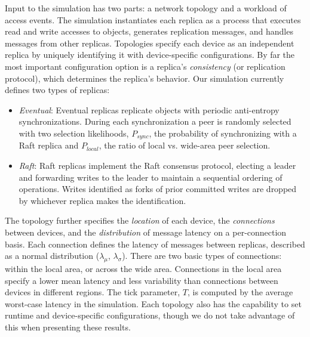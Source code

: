Input to the simulation has two parts: a network topology and a workload of access events.
The simulation instantiates each replica as a process that executes read and write accesses to objects, generates replication messages, and handles messages from other replicas.
Topologies specify each device as an independent replica by uniquely identifying it with device-specific configurations.
By far the most important configuration option is a replica's \textit{consistency} (or replication protocol), which determines the replica's behavior.
Our simulation currently defines two types of replicas:

\begin{itemize}
    \item \emph{Eventual}: Eventual replicas replicate objects with periodic anti-entropy synchronizations. During each synchronization a peer is randomly selected with two selection likelihoods, $P_{sync}$, the probability of synchronizing with a Raft replica and $P_{local}$, the ratio of local vs. wide-area peer selection.
    \item \emph{Raft}: Raft replicas implement the Raft consensus protocol, electing a leader and forwarding writes to the leader to maintain a sequential ordering of operations. Writes identified as forks of prior committed writes are dropped by whichever replica makes the identification.
\end{itemize}

The topology further specifies the \textit{location} of each device, the \textit{connections} between devices, and the \textit{distribution} of message latency on a per-connection basis.
Each connection defines the latency of messages between replicas, described as a normal distribution ($\lambda_{\mu}$, $\lambda_{\sigma}$).
There are two basic types of connections: within the local area, or across the wide area.
Connections in the local area specify a lower mean latency and less variability than connections between devices in different regions.
The tick parameter, $T$, is computed by the average worst-case latency in the simulation.
Each topology also has the capability to set runtime and device-specific configurations, though we do not take advantage of this when presenting these results.

